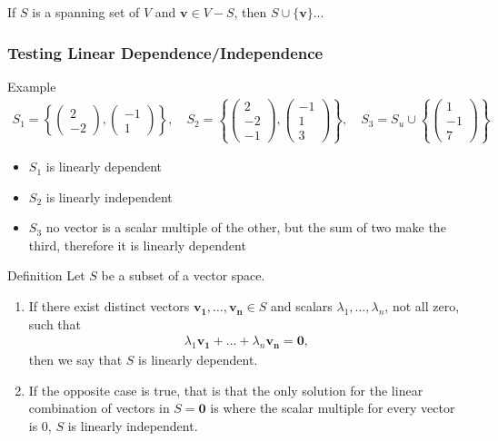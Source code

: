 \documentclass{report}
\renewcommand{\vec}{\mathbf}
\newcommand{\cvec}[1]{ \begin{pmatrix} #1 \end{pmatrix} }
\begin{document}
\begin{enumerate}
	If $S$ is a spanning set of $V$ and $\vec{v} \in V - S$, then $S \cup \{\vec{v}\}$...

	\subsubsection{Testing Linear Dependence/Independence}
		
		\begin{question}{Example}
			\begin{align*}
				S_1 = \left\{ \cvec{2\\-2},\cvec{-1\\1} \right\}, \quad S_2 = \left\{ \cvec{2\\-2\\-1}, \cvec{-1\\1\\3} \right\}, \quad S_3 = S_u \cup \left\{\cvec{1\\-1\\7}\right\}
			\end{align*}
			\begin{itemize}
				\item $S_1$ is linearly dependent
				\item $S_2$ is linearly independent
				\item $S_3$ no vector is a scalar multiple of the other, but the sum of two make the third, therefore it is linearly dependent
			\end{itemize}
		\end{question}

		\begin{question}{Definition}
			Let $S$ be a subset of a vector space.

			\begin{enumerate}
				\item If there exist distinct vectors $\vec{v_1}, \dots, \vec{v_n} \in S$ and scalars $\lambda_1, \dots, \lambda_n$, not all zero, such that 
					\begin{align*}
						\lambda_1\vec{v_1} + \dots + \lambda_n\vec{v_n} = \vec{0},
					\end{align*}
					then we say that $S$ is linearly dependent.
				\item If the opposite case is true, that is that the only solution for the linear combination of vectors in $S = \vec{0}$ is where the scalar multiple for every vector is 0, $S$ is linearly independent.
			\end{enumerate}
			
		\end{question}


\end{enumerate}
\end{document}
